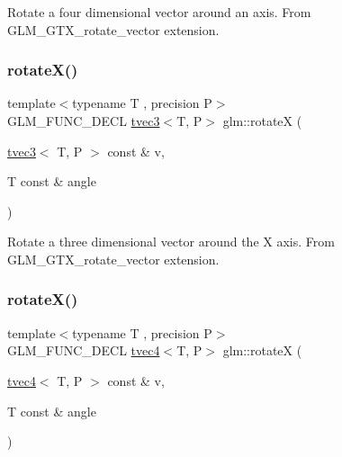Rotate a four dimensional vector around an axis. From G\+L\+M\+\_\+\+G\+T\+X\+\_\+rotate\+\_\+vector extension. \mbox{\label{group__gtx__rotate__vector_ga0c2dc9f8507bffcbb957db9818b18508}} 
\subsubsection{\texorpdfstring{rotate\+X()}{rotateX()}\hspace{0.1cm}{\footnotesize\ttfamily [1/2]}}
{\footnotesize\ttfamily template$<$typename T , precision P$>$ \\
G\+L\+M\+\_\+\+F\+U\+N\+C\+\_\+\+D\+E\+CL \hyperlink{structglm_1_1tvec3}{tvec3}$<$T, P$>$ glm\+::rotateX (\begin{DoxyParamCaption}\item[{\hyperlink{structglm_1_1tvec3}{tvec3}$<$ T, P $>$ const \&}]{v,  }\item[{T const \&}]{angle }\end{DoxyParamCaption})}

Rotate a three dimensional vector around the X axis. From G\+L\+M\+\_\+\+G\+T\+X\+\_\+rotate\+\_\+vector extension. \mbox{\label{group__gtx__rotate__vector_gadab312d430a564741ae02215255027a0}} 
\subsubsection{\texorpdfstring{rotate\+X()}{rotateX()}\hspace{0.1cm}{\footnotesize\ttfamily [2/2]}}
{\footnotesize\ttfamily template$<$typename T , precision P$>$ \\
G\+L\+M\+\_\+\+F\+U\+N\+C\+\_\+\+D\+E\+CL \hyperlink{structglm_1_1tvec4}{tvec4}$<$T, P$>$ glm\+::rotateX (\begin{DoxyParamCaption}\item[{\hyperlink{structglm_1_1tvec4}{tvec4}$<$ T, P $>$ const \&}]{v,  }\item[{T const \&}]{angle }\end{DoxyParamCaption})}

